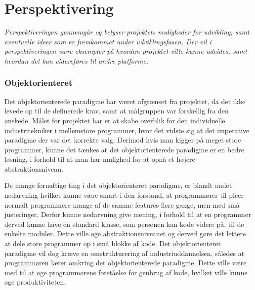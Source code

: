 \chapter{Perspektivering}
\label{sec:Perspektivering}
\textit{Perspektiveringen gennemgår og belyser projektets muligheder for udvikling, samt eventuelle ideer som er fremkommet under udviklingsfasen.
Der vil i perspektiveringen være eksempler på hvordan projektet ville kunne udvides, samt hvordan det kan videreføres til andre platforme.
}

\subsection*{Objektorienteret}
Det objektorienterede paradigme har været afgrænset fra projektet, da det ikke levede op til de definerede krav, samt at målgruppen var forskellig fra den ønskede.
Målet for projektet har er at skabe overblik for den individuelle industritekniker i mellemstore programmer, hvor det vidste sig at det imperative paradigme der var det korrekte valg.
Derimod hvis man kigger på meget store programmer, kunne det tænkes at det objektorienterede paradigme er en bedre løsning, i forhold til at man har mulighed for at opnå et højere abstraktionsniveau.

De mange fornuftige ting i det objektorienteret paradigme, er blandt andet nedarvning hvilket kunne være smart i den forstand, at programmører til \gls{plc}er normalt programmere mange af de samme features flere gange, men med små justeringer.
Derfor kunne nedarvning give mening, i forhold til at en programmør derved kunne have en standard klasse, som personen kan kode videre på, til de enkelte moduler.
Dette ville øge abstraktionsniveauet og derved gøre det lettere at dele store programmer op i små blokke af kode.
Det objektorienteret paradigme vil dog kræve en omstrukturering af industriuddannelsen, således at programmøren lærer omkring det objektorienterede paradigme.
Dette ville være med til at øge programmørens forståelse for genbrug af kode, hvilket ville kunne øge produktiviteten.

